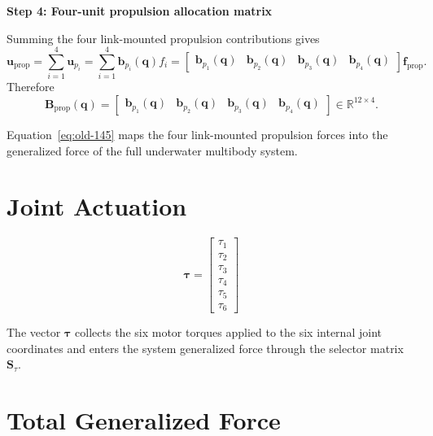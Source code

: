 \documentclass[12pt,a4paper]{report}
\newcommand{\formulaannotation}[1]{\par\noindent{}#1\par\vspace{0.35em}}
\begin{document}
\textbf{Step 4: Four-unit propulsion allocation matrix}

Summing the four link-mounted propulsion contributions gives
\begin{equation}
\mathbf{u}_{\mathrm{prop}}
= \sum_{i=1}^{4} \mathbf{u}_{p_i}
= \sum_{i=1}^{4} \mathbf{b}_{p_i}(\mathbf{q}) f_i
=
\begin{bmatrix}
\mathbf{b}_{p_1}(\mathbf{q}) &
\mathbf{b}_{p_2}(\mathbf{q}) &
\mathbf{b}_{p_3}(\mathbf{q}) &
\mathbf{b}_{p_4}(\mathbf{q})
\end{bmatrix}
\mathbf{f}_{\mathrm{prop}}.
\end{equation}
Therefore
\begin{equation}
\boxed{
\mathbf{B}_{\mathrm{prop}}(\mathbf{q})
=
\begin{bmatrix}
\mathbf{b}_{p_1}(\mathbf{q}) &
\mathbf{b}_{p_2}(\mathbf{q}) &
\mathbf{b}_{p_3}(\mathbf{q}) &
\mathbf{b}_{p_4}(\mathbf{q})
\end{bmatrix}
\in \mathbb{R}^{12\times4}
}.
\end{equation}
\formulaannotation{Equation~\eqref{eq:old-145} maps the four link-mounted propulsion forces into the generalized force of the full underwater multibody system.}

\section{Joint Actuation}

\begin{equation}
\boldsymbol{\tau} = \begin{bmatrix} \tau_{1} \\ \tau_{2} \\ \tau_{3} \\ \tau_{4} \\ \tau_{5} \\ \tau_{6} \end{bmatrix}
\label{eq:old-146}
\end{equation}

The vector $\boldsymbol{\tau}$ collects the six motor torques applied to the six internal joint coordinates and enters the system generalized force through the selector matrix $\mathbf{S}_{\tau}$.

\section{Total Generalized Force}
\end{document}
